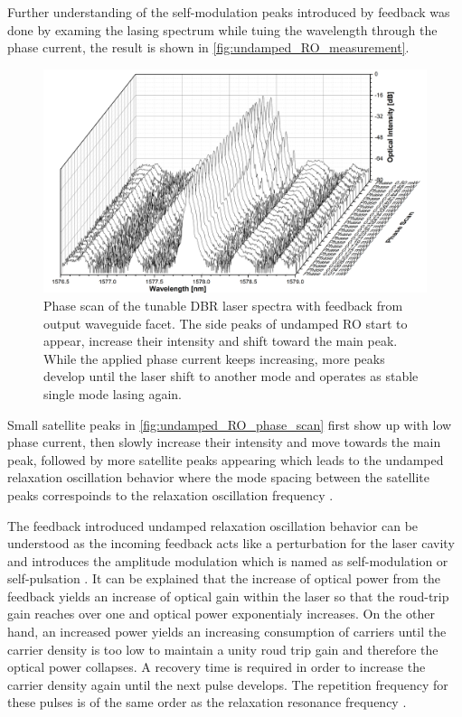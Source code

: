Further understanding of the self-modulation peaks introduced by feedback was done by examing the lasing spectrum while tuing the wavelength through the phase current, the result is shown in \autoref{fig:undamped_RO_measurement}.

\begin{figure}[ht]
    \centering
    \includegraphics[width=\linewidth]{figures/Undamped_RO_phase_scan_grating_4621.png}
    \caption{Phase scan of the tunable DBR laser spectra with feedback from output waveguide facet. The side peaks of undamped RO start to appear, increase their intensity and shift toward the main peak. While the applied phase current keeps increasing, more peaks develop until the laser shift to another mode and operates as stable single mode lasing again.}
    \label{fig:undamped_RO_phase_scan}
\end{figure}

Small satellite peaks in \autoref{fig:undamped_RO_phase_scan} first show up with low phase current, then slowly increase their intensity and move towards the main peak, followed by more satellite peaks appearing which leads to the undamped relaxation oscillation \cite{lenstra1985coherence, bauer2004nonlinear, soriano2013complex} behavior where the mode spacing between the satellite peaks correspoinds to the relaxation oscillation frequency \cite{petermann2012laser}.

The feedback introduced undamped relaxation oscillation behavior \cite{lenstra1985coherence, bauer2004nonlinear, soriano2013complex} can be understood as the incoming feedback acts like a perturbation for the laser cavity and introduces the amplitude modulation which is named as self-modulation \cite{broom1969self, broom1970microwave} or self-pulsation \cite{petermann2012laser}. It can be explained that the increase of optical power from the feedback yields an increase of optical gain within the laser so that the roud-trip gain reaches over one and optical power exponentialy increases. On the other hand, an increased power yields an increasing consumption of carriers until the carrier density is too low to maintain a unity roud trip gain and therefore the optical power collapses. A recovery time is required in order to increase the carrier density again until the next pulse develops. The repetition frequency for these pulses is of the same order as the relaxation resonance frequency \cite{petermann2012laser}.

